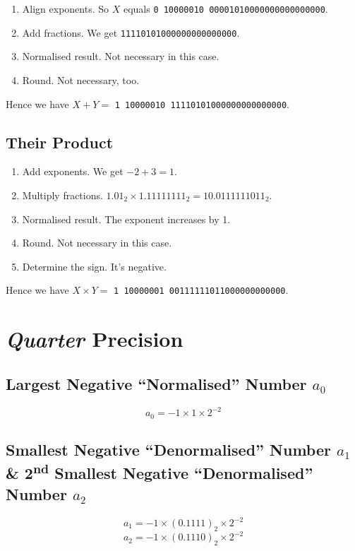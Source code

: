 \documentclass[12pt, a4paper]{article}
\begin{document}
\begin{enumerate}
\item Align exponents. So $X$ equals \texttt{0 10000010 00001010000000000000000}.
\item Add fractions. We get \texttt{11110101000000000000000}.
\item Normalised result. Not necessary in this case.
\item Round. Not necessary, too.
\end{enumerate}

Hence we have $X+Y=$ \texttt{1 10000010 11110101000000000000000}.

\subsection{Their Product}

\begin{enumerate}
\item Add exponents. We get $-2+3=1$.
\item Multiply fractions. $1.01_2\times1.11111111_2=10.0111111011_2$.
\item Normalised result. The exponent increases by 1.
\item Round. Not necessary in this case.
\item Determine the sign. It's negative.
\end{enumerate}

Hence we have $X\times Y=$ \texttt{1 10000001 00111111011000000000000}.

\section{\textit{Quarter} Precision}

\subsection{Largest Negative ``Normalised'' Number $a_0$}

$$a_0=-1\times1\times2^{-2}$$

\subsection{Smallest Negative ``Denormalised'' Number $a_1$ \& 2\textsuperscript{nd} Smallest Negative ``Denormalised'' Number $a_2$}

$$a_1=-1\times(0.1111)_2\times2^{-2}$$
$$a_2=-1\times(0.1110)_2\times2^{-2}$$
\end{document}
